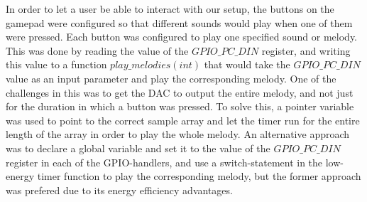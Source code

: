 In order to let a user be able to interact with our setup, the buttons on the gamepad were configured so that different sounds would play when one of them were pressed. Each button was configured to play one specified sound or melody. This was done by reading the value of the $GPIO\_PC\_DIN$ register, and writing this value to a function $play\_melodies(int)$ that would take the $GPIO\_PC\_DIN$ value as an input parameter and play the corresponding melody. One of the challenges in this was to get the DAC to output the entire melody, and not just for the duration in which a button was pressed. To solve this, a pointer variable was used to point to the correct sample array and let the timer run for the entire length of the array in order to play the whole melody. An alternative approach was to declare a global variable and set it to the value of the $GPIO\_PC\_DIN$ register in each of the GPIO-handlers, and use a switch-statement in the low-energy timer function to play the corresponding melody, but the former approach was prefered due to its energy efficiency advantages.